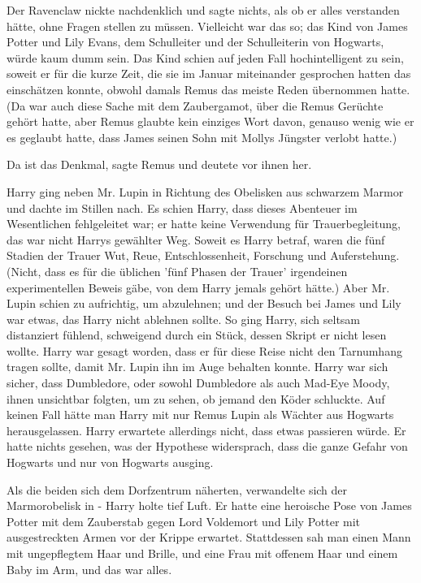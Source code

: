 Der Ravenclaw nickte nachdenklich und sagte nichts, als ob er alles verstanden
hätte, ohne Fragen stellen zu müssen. Vielleicht war das so; das Kind von James
Potter und Lily Evans, dem Schulleiter und der Schulleiterin von Hogwarts, würde
kaum dumm sein. Das Kind schien auf jeden Fall hochintelligent zu sein, soweit
er für die kurze Zeit, die sie im Januar miteinander gesprochen hatten das
einschätzen konnte, obwohl damals Remus das meiste Reden übernommen hatte. (Da
war auch diese Sache mit dem Zaubergamot, über die Remus Gerüchte gehört hatte,
aber Remus glaubte kein einziges Wort davon, genauso wenig wie er es geglaubt
hatte, dass James seinen Sohn mit Mollys Jüngster verlobt hatte.)

\glqq{}Da ist das Denkmal\grqq{}, sagte Remus und deutete vor ihnen her.

Harry ging neben Mr. Lupin in Richtung des Obelisken aus schwarzem Marmor und
dachte im Stillen nach. Es schien Harry, dass dieses Abenteuer im Wesentlichen
fehlgeleitet war; er hatte keine Verwendung für Trauerbegleitung, das war nicht
Harrys gewählter Weg. Soweit es Harry betraf, waren die fünf Stadien der Trauer
Wut, Reue, Entschlossenheit, Forschung und Auferstehung. (Nicht, dass es für die
üblichen 'fünf Phasen der Trauer' irgendeinen experimentellen Beweis gäbe, von
dem Harry jemals gehört hätte.) Aber Mr. Lupin schien zu aufrichtig, um
abzulehnen; und der Besuch bei James und Lily war etwas, das Harry nicht
ablehnen sollte. So ging Harry, sich seltsam distanziert fühlend, schweigend
durch ein Stück, dessen Skript er nicht lesen wollte. Harry war gesagt worden,
dass er für diese Reise nicht den Tarnumhang tragen sollte, damit Mr. Lupin ihn
im Auge behalten konnte. Harry war sich sicher, dass Dumbledore, oder sowohl
Dumbledore als auch Mad-Eye Moody, ihnen unsichtbar folgten, um zu sehen, ob
jemand den Köder schluckte. Auf keinen Fall hätte man Harry mit nur Remus Lupin
als Wächter aus Hogwarts herausgelassen. Harry erwartete allerdings nicht, dass
etwas passieren würde. Er hatte nichts gesehen, was der Hypothese widersprach,
dass die ganze Gefahr von Hogwarts und nur von Hogwarts ausging.

Als die beiden sich dem Dorfzentrum näherten, verwandelte sich der Marmorobelisk
in - Harry holte tief Luft. Er hatte eine heroische Pose von James Potter mit
dem Zauberstab gegen Lord Voldemort und Lily Potter mit ausgestreckten Armen vor
der Krippe erwartet. Stattdessen sah man einen Mann mit ungepflegtem Haar und
Brille, und eine Frau mit offenem Haar und einem Baby im Arm, und das war alles.

